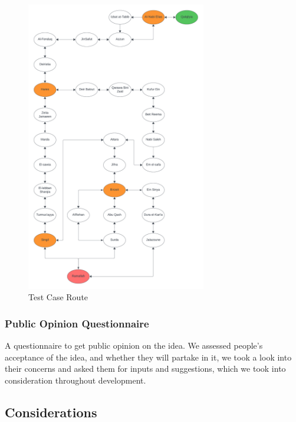 \documentclass[a4paper, 12pt]{report} %
\begin{document}
                \begin{figure}[H]
                    \centering
                    \includegraphics[width=0.7\textwidth, keepaspectratio]{Images/Route_Text_Case.png}
                    \caption{Test Case Route\protect \footnotemark[1]}
                    \label{fig:testcase_route}
                \end{figure}

                \pagebreak
                
            \subsubsection{Public Opinion Questionnaire}
                A questionnaire to get public opinion on the idea. We assessed people’s acceptance of the idea, and whether they will partake in it, we took a look into their concerns and asked them for inputs and suggestions, which we took into consideration throughout development.
            \subsection{Considerations}
\end{document}
